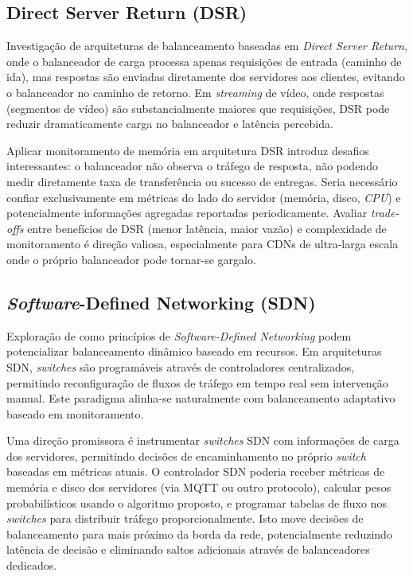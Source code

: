 \subsection{Direct Server Return (DSR)}

Investigação de arquiteturas de balanceamento baseadas em \textit{Direct Server Return}, onde o balanceador de carga processa apenas requisições de entrada (caminho de ida), mas respostas são enviadas diretamente dos servidores aos clientes, evitando o balanceador no caminho de retorno. Em \textit{streaming} de vídeo, onde respostas (segmentos de vídeo) são substancialmente maiores que requisições, DSR pode reduzir dramaticamente carga no balanceador e latência percebida.

Aplicar monitoramento de memória em arquitetura DSR introduz desafios interessantes: o balanceador não observa o tráfego de resposta, não podendo medir diretamente taxa de transferência ou sucesso de entregas. Seria necessário confiar exclusivamente em métricas do lado do servidor (memória, disco, \textit{CPU}) e potencialmente informações agregadas reportadas periodicamente. Avaliar \textit{trade-offs} entre benefícios de DSR (menor latência, maior vazão) e complexidade de monitoramento é direção valiosa, especialmente para CDNs de ultra-larga escala onde o próprio balanceador pode tornar-se gargalo.

\subsection{\textit{Software}-Defined Networking (SDN)}

Exploração de como princípios de \textit{Software-Defined Networking} podem potencializar balanceamento dinâmico baseado em recursos. Em arquiteturas SDN, \textit{switches} são programáveis através de controladores centralizados, permitindo reconfiguração de fluxos de tráfego em tempo real sem intervenção manual. Este paradigma alinha-se naturalmente com balanceamento adaptativo baseado em monitoramento.

Uma direção promissora é instrumentar \textit{switches} SDN com informações de carga dos servidores, permitindo decisões de encaminhamento no próprio \textit{switch} baseadas em métricas atuais. O controlador SDN poderia receber métricas de memória e disco dos servidores (via MQTT ou outro protocolo), calcular pesos probabilísticos usando o algoritmo proposto, e programar tabelas de fluxo nos \textit{switches} para distribuir tráfego proporcionalmente. Isto move decisões de balanceamento para mais próximo da borda da rede, potencialmente reduzindo latência de decisão e eliminando saltos adicionais através de balanceadores dedicados.

